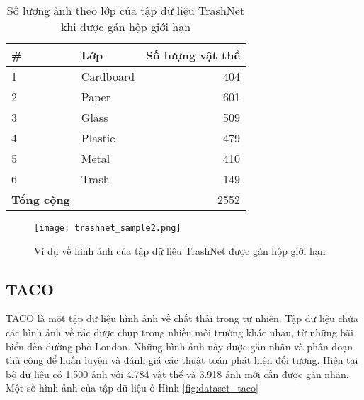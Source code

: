 \documentclass[../the.tex]{subfiles}
\begin{document}
\begin{table}[!ht]
	\centering
	\begin{threeparttable}
		\caption{Số lượng ảnh theo lớp của tập dữ liệu TrashNet khi được gán hộp giới hạn}

		\begin{tabular}{llr}
			\hline
			\multicolumn{1}{l}{
				\textbf{\#}}
			 & \multicolumn{1}{l}{\textbf{Lớp}}
			 & \multicolumn{1}{r}{\textbf{Số lượng vật thể}} \\
			\hline

			1
			 & Cardboard
			 & 404                                           \\
			\hline

			2
			 & Paper
			 & 601                                           \\
			\hline

			3
			 & Glass
			 & 509                                           \\
			\hline

			4
			 & Plastic
			 & 479                                           \\
			\hline

			5
			 & Metal
			 & 410                                           \\
			\hline

			6
			 & Trash
			 & 149                                           \\
			\hline


			\textbf{Tổng cộng}
			 &
			 & 2552                                          \\
			\hline
		\end{tabular}
	\label{tab:dataset1}
	\end{threeparttable}
\end{table}

\begin{figure}[H]
	\centering
	\texttt{[image: trashnet\_sample2.png]}
	\caption{Ví dụ về hình ảnh của tập dữ liệu TrashNet được gán hộp giới hạn}
	\label{fig:dataset_1}
\end{figure}

\subsection{TACO}
\label{sec:TACO}
{\fontsize{13}{12} \selectfont

	TACO là một tập dữ liệu hình ảnh về chất thải trong tự nhiên. Tập dữ liệu chứa các hình ảnh về rác được chụp trong nhiều môi trường khác nhau, từ những bãi biển đến đường phố London. Những hình ảnh này được gắn nhãn và phân đoạn thủ công để huấn luyện và đánh giá các thuật toán phát hiện đối tượng.
	Hiện tại bộ dữ liệu có 1.500 ảnh với 4.784 vật thể
	và 3.918 ảnh mới cần được gán nhãn. Một số hình ảnh của tập dữ liệu ở Hình \ref{fig:dataset_taco}

}
\end{document}
